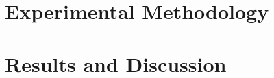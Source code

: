 ~\label{chapter:case-studies}

\section{Experimental Methodology}


\section{Results and Discussion}
% 


